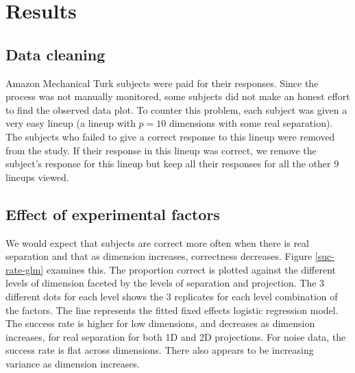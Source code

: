 \section{Results} \label{sec:results}



\subsection{Data cleaning}

Amazon Mechanical Turk subjects were paid for their responses. Since the process was not manually monitored, some subjects did not make an honest effort to find the observed data plot. To counter this problem, each subject was given a very easy lineup (a lineup with $p = 10$ dimensions with some real separation). The subjects who failed to give a correct response to this lineup were removed from the study. If their response in this lineup was correct, we remove the subject's response for this lineup but keep all their responses for all the other 9 lineups viewed.

\subsection{Effect of experimental factors} \label{effects}

We would expect that subjects are correct more often when there is real separation and that as dimension increases, correctness decreases. Figure \ref{suc-rate-glm} examines this. The proportion correct is plotted against the different levels of dimension faceted by the levels of separation and projection. The 3 different dots for each level shows the 3 replicates for each level combination of the factors. The line represents the fitted fixed effects logistic regression model. The success rate is higher for low dimensions, and decreases as dimension increases, for real separation for both 1D and 2D projections. For noise data, the success rate is flat across dimensions. There also appears to be increasing variance as dimension increases.


